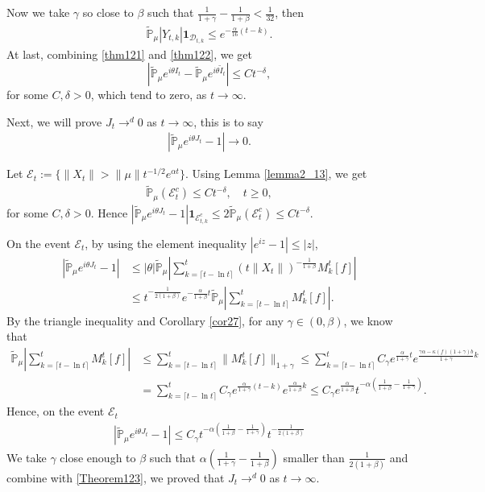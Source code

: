\documentclass[12pt,oneside,english]{amsart}
\theoremstyle{plain}
\theoremstyle{definition}
\numberwithin{equation}{section}
\begin{document}
Now we take $\gamma$ so close to $\beta$ such that $\frac{1}{1+\gamma}-\frac{1}{1+\beta}<\frac{1}{32}$, then
\begin{align}
     \mathbb{\tilde{P}}_{\mu}|Y_{t,k}|\mathbf{1}_{\mathcal{D}_{t,k}}\leq  e^{-\frac{\alpha}{16}(t-k)}.\label{thm122}
\end{align}
At last, combining \eqref{thm121} and \eqref{thm122}, we get
$$\left|\mathbb{\tilde{P}}_{\mu}e^{i\theta I_t}-\mathbb{\tilde{P}}_{\mu}e^{i\theta\tilde{I}_t}\right|\leq C t^{-\delta},$$
for some $C,\delta>0$, which tend to zero, as $t\rightarrow \infty$.

Next, we will prove $J_t \rightarrow^d 0$ as $t\rightarrow \infty$, this is to say
\begin{align*}
    \left|\mathbb{\tilde{P}}_{\mu}e^{i\theta J_t}-1\right|\rightarrow 0.
\end{align*}

Let $\mathcal{E}_t:=\{\|X_t\|>\|\mu\|t^{-1/2}e^{\alpha t}\}$. Using Lemma \ref{lemma2_13}, we get
\begin{align}
    \mathbb{\tilde{P}}_{\mu}(\mathcal{E}^c_t)\leq C t^{-\delta}, \quad t\geq0,\label{Theorem123}
\end{align}
    for some $C,\delta>0$. Hence $\left|\mathbb{\tilde{P}}_{\mu}e^{i\theta J_t}-1\right|\mathbf{1}_{\mathcal{E}^c_{t,k}}\leq 2\mathbb{\tilde{P}}_{\mu}(\mathcal{E}^c_t)\leq Ct^{-\delta}$.

On the event $\mathcal{E}_t$, by using the element inequality $|e^{i z}-1|\leq |z|$,
\begin{align*}
    \left|\mathbb{\tilde{P}}_{\mu}e^{i\theta J_t}-1\right|&\leq|\theta| \mathbb{\tilde{P}}_{\mu}\left|\sum_{k=\lceil t-\ln t \rceil}^t \left(t\|X_t\|\right)^{-\frac{1}{1+\beta}}M_k^t[f]\right|\\
    &\leq t^{-\frac{1}{2(1+\beta)}}e^{-\frac{\alpha}{1+\beta}t}\mathbb{\tilde{P}}_{\mu}\left|\sum_{k=\lceil t-\ln t \rceil}^t M_k^t[f]\right|.
\end{align*}
By the triangle inequality and Corollary \ref{cor27}, for any $\gamma\in(0,\beta)$, we know that
\begin{align*}
    \mathbb{\tilde{P}}_{\mu}\left|\sum_{k=\lceil t-\ln t \rceil}^t M_k^t[f]\right|&\leq \sum_{k=\lceil t-\ln t \rceil}^t \|M_k^t[f]\|_{1+\gamma}\leq\sum_{k=\lceil t-\ln t \rceil}^t C_{\gamma}e^{\frac{\alpha}{1+\gamma}t}e^{\frac{\gamma \alpha-\kappa(f)(1+\gamma)b}{1+\gamma}k}\\
    &=\sum_{k=\lceil t-\ln t \rceil}^t C_{\gamma}e^{\frac{\alpha}{1+\gamma}(t-k)}e^{\frac{\alpha}{1+\beta}k}\leq C_{\gamma}e^{\frac{\alpha}{1+\beta}}t^{-\alpha(\frac{1}{1+\beta}-\frac{1}{1+\gamma})}.
\end{align*}
Hence, on the event $\mathcal{E}_t$
\begin{align*}
    \left|\mathbb{\tilde{P}}_{\mu}e^{i\theta J_t}-1\right|\leq C_{\gamma}t^{-\alpha(\frac{1}{1+\beta}-\frac{1}{1+\gamma})} t^{-\frac{1}{2(1+\beta)}}
\end{align*}
We take $\gamma$ close enough to $\beta$ such that $\alpha(\frac{1}{1+\gamma}-\frac{1}{1+\beta})$ smaller than $\frac{1}{2(1+\beta)}$ and combine with \eqref{Theorem123}, we proved that $J_t \rightarrow^d 0$ as $t\rightarrow \infty$.
\end{document}
